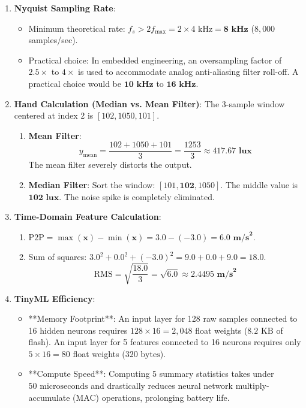 \begin{enumerate}
    \item \textbf{Nyquist Sampling Rate}:
    \begin{itemize}
        \item Minimum theoretical rate: $f_s > 2 f_{\max} = 2 \times 4\text{ kHz} = \mathbf{8\text{ kHz}}$ ($8{,}000$ samples/sec).
        \item Practical choice: In embedded engineering, an oversampling factor of $2.5\times$ to $4\times$ is used to accommodate analog anti-aliasing filter roll-off. A practical choice would be $\mathbf{10\text{ kHz}}$ to $\mathbf{16\text{ kHz}}$.
    \end{itemize}

    \item \textbf{Hand Calculation (Median vs. Mean Filter)}:
    The 3-sample window centered at index 2 is $[102, 1050, 101]$.
    \begin{enumerate}
        \item \textbf{Mean Filter}:
        \begin{equation*}
        y_{\text{mean}} = \frac{102 + 1050 + 101}{3} = \frac{1253}{3} \approx \mathbf{417.67\text{ lux}}
        \end{equation*}
        The mean filter severely distorts the output.
        \item \textbf{Median Filter}:
        Sort the window: $[101, \mathbf{102}, 1050]$. The middle value is $\mathbf{102\text{ lux}}$. The noise spike is completely eliminated.
    \end{enumerate}

    \item \textbf{Time-Domain Feature Calculation}:
    \begin{enumerate}
        \item $\text{P2P} = \max(\mathbf{x}) - \min(\mathbf{x}) = 3.0 - (-3.0) = \mathbf{6.0\text{ m/s}^2}$.
        \item Sum of squares: $3.0^2 + 0.0^2 + (-3.0)^2 = 9.0 + 0.0 + 9.0 = 18.0$.
        \begin{equation*}
        \text{RMS} = \sqrt{\frac{18.0}{3}} = \sqrt{6.0} \approx \mathbf{2.4495\text{ m/s}^2}
        \end{equation*}
    \end{enumerate}

    \item \textbf{TinyML Efficiency}:
    \begin{itemize}
        \item **Memory Footprint**: An input layer for 128 raw samples connected to 16 hidden neurons requires $128 \times 16 = 2{,}048$ float weights ($8.2\text{ KB}$ of flash). An input layer for 5 features connected to 16 neurons requires only $5 \times 16 = 80$ float weights ($320\text{ bytes}$).
        \item **Compute Speed**: Computing 5 summary statistics takes under $50\text{ microseconds}$ and drastically reduces neural network multiply-accumulate (MAC) operations, prolonging battery life.
    \end{itemize}


\end{enumerate}
